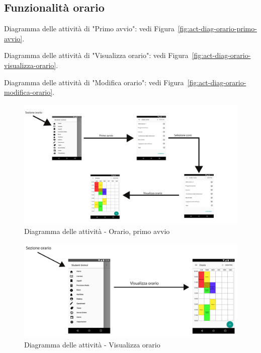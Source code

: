 \subsection{Funzionalità orario}

Diagramma delle attività di "Primo avvio": vedi Figura~\vref{fig:act-diag-orario-primo-avvio}.

Diagramma delle attività di "Visualizza orario": vedi Figura~\vref{fig:act-diag-orario-visualizza-orario}.

Diagramma delle attività di "Modifica orario": vedi Figura~\vref{fig:act-diag-orario-modifica-orario}.

\begin{figure}[h]
	\centering
	\includegraphics[width=\textwidth]{imgs/gruppo2/activity-orario-primo-avvio}
	\caption{Diagramma delle attività - Orario, primo avvio}
	\label{fig:act-diag-orario-primo-avvio}
\end{figure}

\begin{figure}
	\centering
	\includegraphics[width=\textwidth]{imgs/gruppo2/activity-orario-visualizza-orario}
	\caption{Diagramma delle attività - Visualizza orario}
	\label{fig:act-diag-orario-visualizza-orario}
\end{figure}

